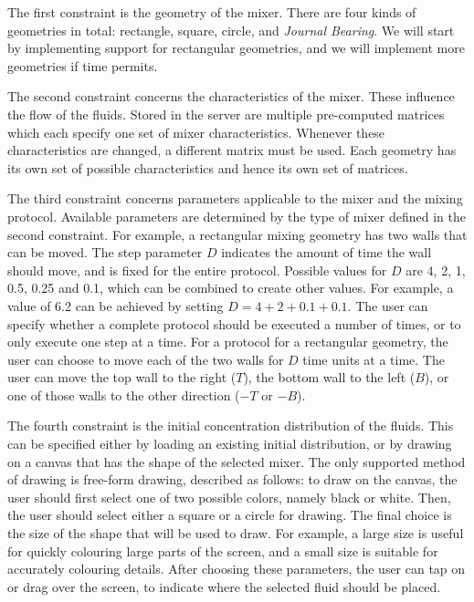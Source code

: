 The first constraint is the geometry of the mixer. There are four kinds of geometries in total: rectangle, square, circle, and \emph{Journal Bearing}. We will start by implementing support for rectangular geometries, and we will implement more geometries if time permits.

The second constraint concerns the characteristics of the mixer. These influence the flow of the fluids. Stored in the server are multiple pre-computed matrices which each specify one set of mixer characteristics. Whenever these characteristics are changed, a different matrix must be used. Each geometry has its own set of possible characteristics and hence its own set of matrices.

The third constraint concerns parameters applicable to the mixer and the mixing protocol. Available parameters are determined by the type of mixer defined in the second constraint. For example, a rectangular mixing geometry has two walls that can be moved. The step parameter $D$ indicates the amount of time the wall should move, and is fixed for the entire protocol. Possible values for $D$ are 4, 2, 1, 0.5, 0.25 and 0.1, which can be combined to create other values. For example, a value of 6.2 can be achieved by setting $D=4+2+0.1+0.1$. The user can specify whether a complete protocol should be executed a number of times, or to only execute one step at a time. For a protocol for a rectangular geometry, the user can choose to move each of the two walls for $D$ time units at a time. The user can move the top wall to the right ($T$), the bottom wall to the left ($B$), or one of those walls to the other direction ($-T$ or $-B$).

The fourth constraint is the initial concentration distribution of the fluids. This can be specified either by loading an existing initial distribution, or by drawing on a canvas that has the shape of the selected mixer. The only supported method of drawing is free-form drawing, described as follows: to draw on the canvas, the user should first select one of two possible colors, namely black or white. Then, the user should select either a square or a circle for drawing. The final choice is the size of the shape that will be used to draw. For example, a large size is useful for quickly colouring large parts of the screen, and a small size is suitable for accurately colouring details. After choosing these parameters, the user can tap on or drag over the screen, to indicate where the selected fluid should be placed.

